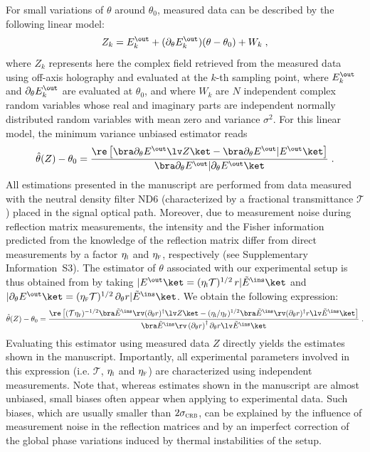\documentclass[aps,pra,twocolumn,amsmath,amssymb,superscriptaddress,10pt,nobibnotes]{revtex4-2}
\begin{document}
For small variations of $\theta$ around $\theta_0$, measured data can be described by the following linear model:
\begin{equation}
Z_k= E^{\out}_k+ (\partial_\theta E^{\out}_k ) (\theta-\theta_0) + W_k \; , 
\end{equation}
where $Z_k$ represents here the complex field retrieved from the measured data using off-axis holography and evaluated at the $k$-th sampling point, where $E^{\out}_k$ and $\partial_\theta E^{\out}_k$ are evaluated at $\theta_0$, and where $W_k$ are $N$ independent complex random variables whose real and imaginary parts are independent normally distributed random variables with mean zero and variance $\sigma^2$. For this linear model, the minimum variance unbiased estimator reads~\cite{kay_fundamentals_1993_1}
\begin{equation}
\hat{\theta}(Z) -\theta_0 = \frac{\re \left[ \bra \partial_\theta E^\out \lv Z \ket -\bra \partial_\theta E^\out | E^\out \ket \right]}{\bra \partial_\theta E^\out | \partial_\theta E^\out \ket } \; .
\label{eq_estimator}
\end{equation}
All estimations presented in the manuscript are performed from data measured with the neutral density filter ND6 (characterized by a fractional transmittance $\mathcal{T}$) placed in the signal optical path. Moreover, due to measurement noise during reflection matrix measurements, the intensity and the Fisher information predicted from the knowledge of the reflection matrix differ from direct measurements by a factor $\eta_\textsc{i}$ and $\eta_\textsc{f}$, respectively (see Supplementary Information~S3). The estimator of $\theta$ associated with our experimental setup is thus obtained from  by taking $|E^\out\ket=(\eta_\textsc{i} \mathcal{T})^{1/2} \, r |\tilde{E}^\ins\ket$ and $ |\partial_\theta E^\out \ket= (\eta_\textsc{f} \mathcal{T})^{1/2} \, \partial_\theta r |\tilde{E}^\ins\ket$. We obtain the following expression:
\begin{equation}
\hat{\theta}(Z) - \theta_0 = \frac{\re \left[ (\mathcal{T} \eta_\textsc{f})^{-1/2} \bra \tilde{E}^\ins \rv (\partial_\theta r) ^\dagger \lv Z \ket - (\eta_\textsc{i}/ \eta_\textsc{f})^{1/2} \bra \tilde{E}^\ins \rv (\partial_\theta r) ^\dagger r \lv \tilde{E}^\ins \ket\right]}{ \bra \tilde{E}^\ins \rv \left(\partial_\theta r\right) ^\dagger \partial_\theta r \lv \tilde{E}^\ins \ket } \; .
\label{eq_estimator2}
\end{equation}
Evaluating this estimator using measured data $Z$ directly yields the estimates shown in the manuscript. Importantly, all experimental parameters involved in this expression (i.e. $\mathcal{T}$, $\eta_\textsc{i}$ and $\eta_\textsc{f}$) are characterized using independent measurements. Note that, whereas estimates shown in the manuscript are almost unbiased, small biases often appear when applying  to experimental data. Such biases, which are usually smaller than $2\sigma_{\textsc{crb}}$, can be explained by the influence of measurement noise in the reflection matrices and by an imperfect correction of the global phase variations induced by thermal instabilities of the setup. 
\end{document}
